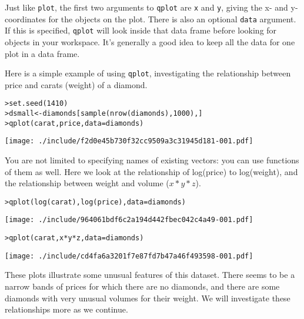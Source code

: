 Just like {\tt plot}, the first two arguments to {\tt qplot} are {\tt x} and {\tt y}, giving the x- and y-coordinates for the objects on the plot. There is also an optional {\tt data} argument.  If this is specified, {\tt qplot} will look inside that data frame before looking for objects in your workspace.  It's generally a good idea to keep all the data for one plot in a data frame.

Here is a simple example of using {\tt qplot}, investigating the relationship between price and carats (weight) of a diamond.  

\begin{alltt}
> set.seed(1410)
> dsmall <- diamonds[sample(nrow(diamonds), 1000), ]
> qplot(carat, price, data = diamonds)
\end{alltt}
\texttt{[image: ./include/f2d0e45b730f32cc9509a3c31945d181-001.pdf]}
\begin{alltt}

\end{alltt}

You are not limited to specifying names of existing vectors: you can use functions of them as well.  Here we look at the relationship of log(price) to log(weight), and the relationship between weight and volume ($x * y * z$).

\begin{alltt}
> qplot(log(carat), log(price), data = diamonds)
\end{alltt}
\texttt{[image: ./include/964061bdf6c2a194d442fbec042c4a49-001.pdf]}
\begin{alltt}

> qplot(carat, x * y * z, data = diamonds)
\end{alltt}
\texttt{[image: ./include/cd4fa6a3201f7e87fd7b47a46f493598-001.pdf]}
\begin{alltt}

\end{alltt}

These plots illustrate some unusual features of this dataset.  There seems to be a narrow bands of prices for which there are no diamonds, and there are some diamonds with very unusual volumes for their weight.  We will investigate these relationships more as we continue.

